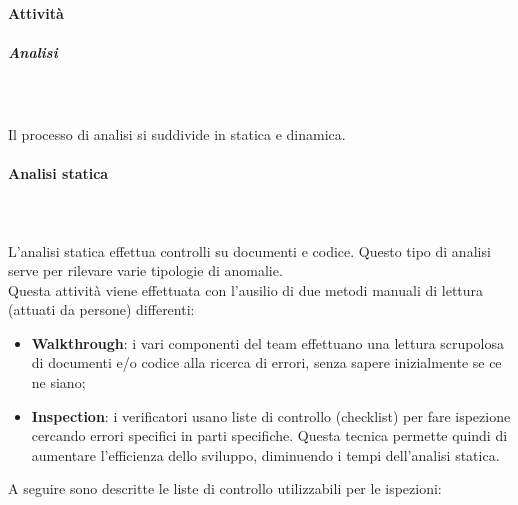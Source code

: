 \paragraph{Attività}

\subparagraph{Analisi} \mbox{} \\ \mbox{} \\
Il processo di analisi si suddivide in statica e dinamica.

\paragraph*{Analisi statica} \mbox{} \\ \mbox{} \\
L'analisi statica effettua controlli su documenti e codice. Questo tipo di analisi serve per rilevare varie tipologie di anomalie. \\
Questa attività viene effettuata con l'ausilio di due metodi manuali di lettura (attuati da persone) differenti: \begin{itemize}
\item \textbf{Walkthrough}: i vari componenti del team effettuano una lettura scrupolosa di documenti e/o codice alla ricerca di errori, senza sapere inizialmente se ce ne siano;
\item \textbf{Inspection}: i verificatori usano liste di controllo (checklist) per fare ispezione cercando errori specifici in parti specifiche. Questa tecnica permette quindi di aumentare l'efficienza dello sviluppo, diminuendo i tempi dell'analisi statica.
\end{itemize}
A seguire sono descritte le liste di controllo utilizzabili per le ispezioni:
